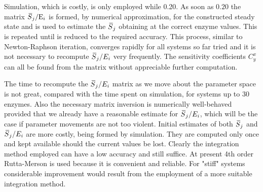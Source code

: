 Simulation, which is costly, is only employed while 0.20. As soon as $0.20$ the matrix $\,\overline{\!{S}}_j/\mathrm{E}_i$ is formed, by numerical approximation, for the constructed steady state and is used to estimate the $\,\overline{\!{S}}_j$ obtaining at the correct enzyme values. This is repeated until is reduced to the required accuracy. This process, similar to Newton-Raphson iteration, converges rapidly for all systems so far tried and it is not necessary to recompute $\,\overline{\!{S}}_j/E_i$ very frequently. The sensitivity coefficients $C_y^{x}$ can all be found from the matrix without appreciable further computation.

The time to recompute the $\,\overline{\!{S}}_j/E_i$ matrix as we move about the parameter space is not great, compared with the time spent on simulation, for systems up to 30 enzymes. Also the necessary matrix inversion is numerically well-behaved provided that we already have a reasonable estimate for $\,\overline{\!{S}}_j/E_i$, which will be the case if parameter movements are not too violent. Initial estimates of both $\,\overline{\!{S}}_j$ and $\,\overline{\!{S}}_j/E_i$ are more costly, being formed by simulation. They are computed only once and kept available should the current values be lost. Clearly the integration method employed can have a low accuracy and still suffice. At present 4th order Rutta-Merson is used because it is convenient and reliable. For "stiff" systems considerable improvement would result from the employment of a more suitable integration method.


